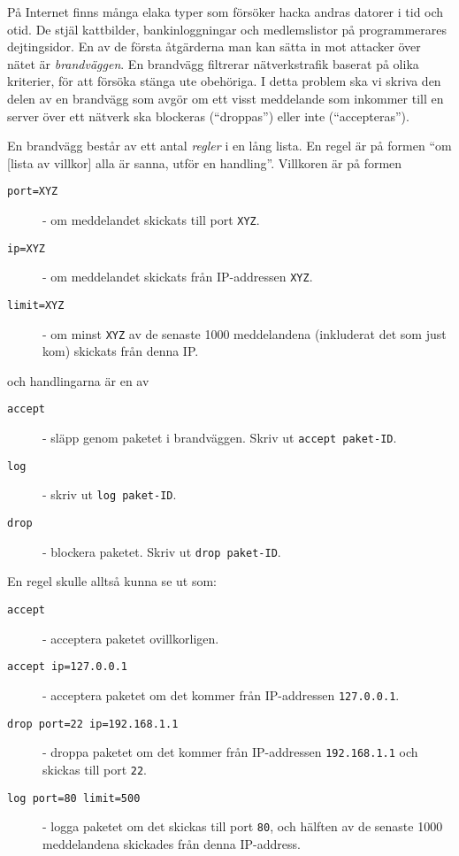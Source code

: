 
På Internet finns många elaka typer som försöker hacka andras datorer i tid och otid. De stjäl kattbilder, bankinloggningar och medlemslistor på programmerares dejtingsidor.
En av de första åtgärderna man kan sätta in mot attacker över nätet är \emph{brandväggen}. En brandvägg filtrerar nätverkstrafik baserat på olika kriterier, för att försöka
stänga ute obehöriga. I detta problem ska vi skriva den delen av en brandvägg som avgör om ett visst meddelande som inkommer till en server över ett nätverk ska blockeras (``droppas'') eller inte (``accepteras''). 

En brandvägg består av ett antal \emph{regler} i en lång lista. En regel är på formen ``om [lista av villkor] alla är sanna, utför en handling''. Villkoren är på formen

\begin{description}
	\item[\texttt{port=XYZ}] - om meddelandet skickats till port \texttt{XYZ}.
	\item[\texttt{ip=XYZ}] - om meddelandet skickats från IP-addressen \texttt{XYZ}.
	\item[\texttt{limit=XYZ}] - om minst \texttt{XYZ} av de senaste 1000 meddelandena (inkluderat det som just kom) skickats från denna IP.
\end{description}

och handlingarna är en av

\begin{description}
	\item[\texttt{accept}] - släpp genom paketet i brandväggen. Skriv ut \texttt{accept paket-ID}.
	\item[\texttt{log}] - skriv ut \texttt{log paket-ID}.
	\item[\texttt{drop}] - blockera paketet. Skriv ut \texttt{drop paket-ID}.
\end{description}

En regel skulle alltså kunna se ut som:
\begin{description}
	\item[\texttt{accept}] - acceptera paketet ovillkorligen.
	\item[\texttt{accept ip=127.0.0.1}] - acceptera paketet om det kommer från IP-addressen \texttt{127.0.0.1}.
	\item[\texttt{drop port=22 ip=192.168.1.1}] - droppa paketet om det kommer från IP-addressen \texttt{192.168.1.1} och skickas till port \texttt{22}.
	\item[\texttt{log port=80 limit=500}] - logga paketet om det skickas till port \texttt{80}, och hälften av de senaste 1000 meddelandena skickades från denna IP-address.
\end{description}

